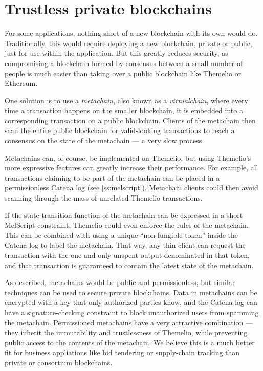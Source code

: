 \documentclass[headinclude]{scrbook}
\begin{document}
\section{Trustless private blockchains}

For some applications, nothing short of a new blockchain with its own would do. Traditionally, this would require deploying a new blockchain, private or public, just for use within the application. But this greatly reduces security, as compromising a blockchain formed by consensus between a small number of people is much easier than taking over a public blockchain like Themelio or Ethereum.

One solution is to use a \emph{metachain}, also known as a \emph{virtualchain}, where every time a transaction happens on the smaller blockchain, it is embedded into a corresponding transaction on a public blockchain. Clients of the metachain then scan the entire public blockchain for valid-looking transactions to reach a consensus on the state of the metachain --- a very slow process.

Metachains can, of course, be implemented on Themelio, but using Themelio's more expressive features can greatly increase their performance. For example, all transactions claiming to be part of the metachain can be placed in a permissionless Catena log (see \ref{ss:melscript}). Metachain clients could then avoid scanning through the mass of unrelated Themelio transactions. 

If the state transition function of the metachain can be expressed in a short MelScript constraint, Themelio could even enforce the rules of the metachain. This can be combined with using a unique ``non-fungible token'' inside the Catena log to label the metachain. That way, any thin client can request the transaction with the one and only unspent output denominated in that token, and that transaction is guaranteed to contain the latest state of the metachain.

As described, metachains would be public and permissionless, but similar techniques can be used to secure private blockchains. Data in metachains can be encrypted with a key that only authorized parties know, and the Catena log can have a signature-checking constraint to block unauthorized users from spamming the metachain. Permissioned metachains have a very attractive combination --- they inherit the immutability and trustlessness of Themelio, while preventing public access to the contents of the metachain. We believe this is a much better fit for business appliations like bid tendering or supply-chain tracking than private or consortium blockchains.




\printbibliography
\end{document}
